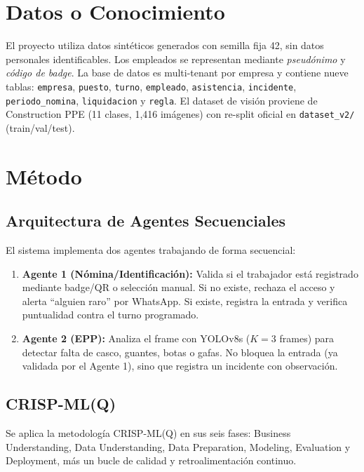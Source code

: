 \documentclass[conference,spanish]{IEEEtran}
\begin{document}
\section{Datos o Conocimiento}
El proyecto utiliza datos sintéticos generados con semilla fija 42, sin datos personales identificables. Los empleados se representan mediante \emph{pseudónimo} y \emph{código de badge}. La base de datos es multi-tenant por empresa y contiene nueve tablas: \texttt{empresa}, \texttt{puesto}, \texttt{turno}, \texttt{empleado}, \texttt{asistencia}, \texttt{incidente}, \texttt{periodo\_nomina}, \texttt{liquidacion} y \texttt{regla}. El dataset de visión proviene de Construction PPE (11 clases, 1,416 imágenes) con re-split oficial en \texttt{dataset\_v2/} (train/val/test).

\section{Método}
\subsection{Arquitectura de Agentes Secuenciales}
El sistema implementa dos agentes trabajando de forma secuencial:

\begin{enumerate}
    \item \textbf{Agente 1 (Nómina/Identificación):} Valida si el trabajador está registrado mediante badge/QR o selección manual. Si no existe, rechaza el acceso y alerta ``alguien raro'' por WhatsApp. Si existe, registra la entrada y verifica puntualidad contra el turno programado.
    \item \textbf{Agente 2 (EPP):} Analiza el frame con YOLOv8s ($K=3$ frames) para detectar falta de casco, guantes, botas o gafas. No bloquea la entrada (ya validada por el Agente 1), sino que registra un incidente con observación.
\end{enumerate}

\subsection{CRISP-ML(Q)}
Se aplica la metodología CRISP-ML(Q) en sus seis fases: Business Understanding, Data Understanding, Data Preparation, Modeling, Evaluation y Deployment, más un bucle de calidad y retroalimentación continuo.
\end{document}
